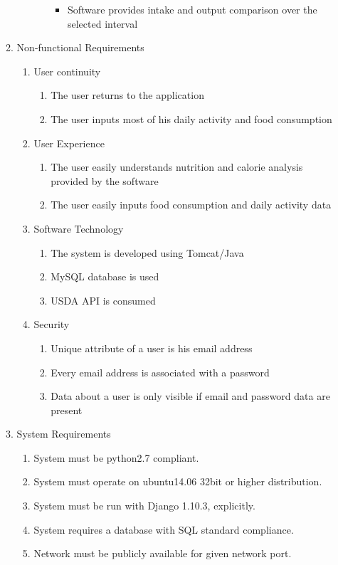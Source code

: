 \begin{enumerate}
\begin{enumerate}
\begin{enumerate}
\begin{enumerate}
\begin{itemize}
			\item Software provides intake and output comparison over the selected interval
			\end{itemize}
		\end{enumerate}
		\end{enumerate}
\newpage
	\item Non-functional Requirements
		\begin{enumerate}
		\item User continuity
			\begin{enumerate}
			\item The user returns to the application
			\item The user inputs most of his daily activity and food consumption
			\end{enumerate}
		\item User Experience
			\begin{enumerate}
			\item The user easily understands nutrition and calorie analysis provided by the software
			\item The user easily inputs food consumption and daily activity data
			\end{enumerate}
		\item Software Technology
			\begin{enumerate}
			\item The system is developed using Tomcat/Java
			\item MySQL database is used
			\item USDA API is consumed
			\end{enumerate}
		\item Security
			\begin{enumerate}
			\item Unique attribute of a user is his email address
			\item Every email address is associated with a password
			\item Data about a user is only visible if email and password data are present
			\end{enumerate}
		\end{enumerate}
		\item System Requirements
		\begin{enumerate}
		\item System must be python2.7 compliant.
		\item System must operate on ubuntu14.06 32bit or higher distribution.
		\item System must be run with Django 1.10.3, explicitly.
		\item System requires a database with SQL standard compliance.
		\item Network must be publicly available for given network port.		
		\end{enumerate}
	\end{enumerate}
\end{enumerate}
